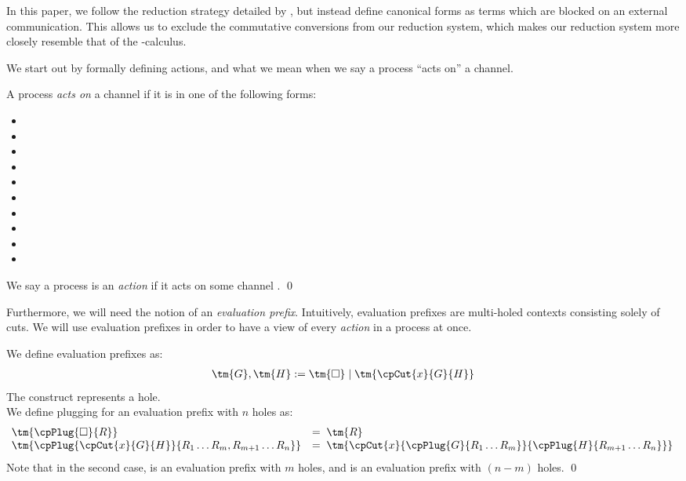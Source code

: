 \documentclass[UKenglish]{llncs}
\begin{document}
In this paper, we follow the reduction strategy detailed by
\citeauthor{lindley2015semantics}, but instead define canonical forms as terms
which are blocked on an external communication.
This allows us to exclude the commutative conversions from our reduction system,
which makes our reduction system more closely resemble that of the
\textpi-calculus.

We start out by formally defining actions, and what we mean when we say a
process ``acts on'' a channel.
\begin{definition}[Actions]\label{def:cp-action}
  A process  \emph{acts on} a channel  if it is in one of the
  following forms:
  \begin{multicols}{3}
    \begin{itemize}[noitemsep,topsep=0pt,parsep=0pt,partopsep=0pt]
    \item {}
    \item {}
    \item {}
    \item {}
    \item {}
    \item {}
    \item {}
    \item {}
    \item {}
    \item {}
    \end{itemize}
  \end{multicols}
  \noindent
  We say a process  is an \emph{action} if it acts on some channel .
  \qed
\end{definition}
Furthermore, we will need the notion of an \emph{evaluation prefix}.
Intuitively, evaluation prefixes are multi-holed contexts consisting solely of
cuts. We will use evaluation prefixes in order to have a view of every
\emph{action} in a process at once.
\begin{definition}\label{def:cp-evaluation-prefixes}
  We define evaluation prefixes as:
  \begin{align*}
    \tm{G}, \tm{H} := \tm{\Box} \mid \tm{\cpCut{x}{G}{H}}
  \end{align*}
  The \tm{\Box} construct represents a hole.
  \\
  We define plugging for an evaluation prefix with $n$ holes as:
  \begin{align*}
    \!\begin{array}{ll}
      \tm{\cpPlug{\Box}{R}} & = \; \tm{R} \\
      \tm{\cpPlug{\cpCut{x}{G}{H}}{R_1 \dots R_m, R_{m+1} \dots R_{n}}}
                            & = \; \tm{\cpCut{x}{\cpPlug{G}{R_1 \dots R_m}}{\cpPlug{H}{R_{m+1} \dots R_n}}}
    \end{array}
  \end{align*}
  Note that in the second case,  is an evaluation prefix with $m$ holes,
  and  is an evaluation prefix with $(n-m)$ holes.
  \qed
\end{definition}
\end{document}
